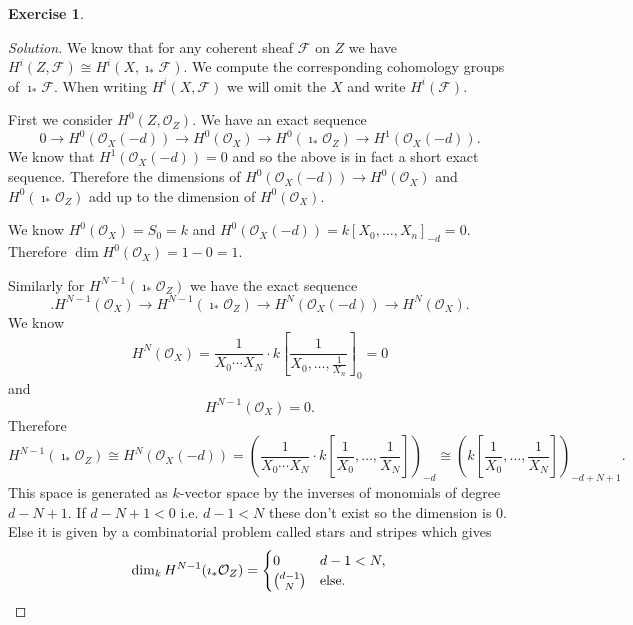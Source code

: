 \documentclass{article}
\renewcommand{\qedsymbol}{\raisebox{-0.5cm}{}}
\newcommand{\sheaf}{\mathcal{O}}
\newcommand{\FF}{\mathcal{F}}
\newcommand{\incl}{\imath}
\newenvironment{solution}{\begin{proof}[Solution]\renewcommand\qedsymbol{}}{\end{proof}}
\theoremstyle{definition}
\newtheorem{question}{Exercise}
\begin{document}
\begin{question}
\begin{enumerate}[(i)]
              \begin{solution}
                  We know that for any coherent sheaf \(\FF\) on \(Z\) we have
                  \(H^{i}(Z,\FF)\cong H^{i}(X,\incl_{*}\FF)\). We compute the
                  corresponding cohomology groups of \(\incl_{*}\FF\). When
                  writing \(H^{i}(X,\FF)\) we will omit the \(X\) and write
                  \(H^{i}(\FF)\).

                  First we consider \(H^{0}(Z,\sheaf_{Z})\). We have an exact
                  sequence
                  \[
                      0\to H^{0}(\sheaf_{X}(-d))\to H^{0}(\sheaf_{X})\to H^{0}(\incl_{*}\sheaf_{Z})\to H^{1}(\sheaf_{X}(-d)).
                  \]
                  We know that \(H^{1}(\sheaf_{X}(-d))=0\) and so the above is
                  in fact a short exact sequence. Therefore the dimensions of
                  \(H^{0}(\sheaf_{X}(-d))\to H^{0}(\sheaf_{X})\) and
                  \(H^{0}(\incl_{*}\sheaf_{Z})\) add up to the dimension of
                  \(H^{0}(\sheaf_{X})\).

                  We know \(H^{0}(\sheaf_{X})=S_{0}=k\) and
                  \(H^{0}(\sheaf_{X}(-d))=k[X_{0},\ldots,X_{n}]_{-d}=0\).
                  Therefore \(\dim H^{0}(\sheaf_{X})=1-0=1\).

                  Similarly for \(H^{N-1}(\incl_{*}\sheaf_{Z})\) we have the
                  exact sequence
                  \[
                      .H^{N-1}(\sheaf_{X})\to H^{N-1}(\incl_{*}\sheaf_{Z})\to H^{N}(\sheaf_{X}(-d))\to H^{N}(\sheaf_{X}).
                  \]
                  We know
                  \[
                      H^{N}(\sheaf_{X})=\frac{1}{X_{0}\cdots X_{N}}\cdot k\left[\frac{1}{X_{0},\ldots,\frac{1}{X_{n}}}\right]_{0}=0
                  \]
                  and
                  \[
                      H^{N-1}(\sheaf_{X})=0.
                  \]
                  Therefore
                  \[
                      H^{N-1}(\incl_{*}\sheaf_{Z})\cong H^{N}(\sheaf_{X}(-d))=\left(\frac{1}{X_{0}\cdots X_{N}}\cdot k\left[\frac{1}{X_{0}},\ldots,\frac{1}{X_{N}}\right]\right)_{-d}\cong \left(k\left[\frac{1}{X_{0}},\ldots,\frac{1}{X_{N}}\right]\right)_{-d+N+1}.
                  \]
                  This space is generated as \(k\)-vector space by the inverses
                  of monomials of degree \(d-N+1\). If \(d-N+1<0\) i.e.
                  \(d-1<N\) these don't exist so the dimension is \(0\). Else it
                  is given by a combinatorial problem called stars and stripes
                  which gives
                  \[
                      \dim_{k}H^{N-1}(\incl_{*}\sheaf_{Z})=\begin{cases}
                          0              & d-1<N,             \\
                          \binom{d-1}{N} & \textnormal{else}.
                      \end{cases}
                  \]
              \end{solution}
    \end{enumerate}


\end{question}
\end{document}
